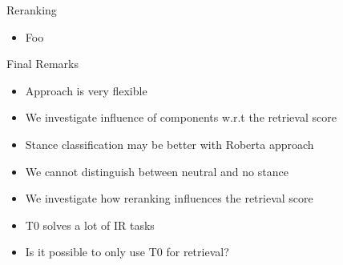 \documentclass[english]{mlutalk}
\begin{document}
\begin{frame}{Reranking}
    \begin{itemize}
        \item Foo
    \end{itemize}
\end{frame}

\begin{frame}{Final Remarks}
    \begin{itemize}
        \item Approach is very flexible 
        \item We investigate influence of components w.r.t the retrieval score
        \item Stance classification may be better with Roberta approach
        \item We cannot distinguish between neutral and no stance
        \item We investigate how reranking influences the retrieval score
        \item T0 solves a lot of IR tasks
        \item Is it possible to only use T0 for retrieval?
    \end{itemize}
    \thankyou
\end{frame}

\appendix
\section{\appendixname}

\bibliographyframe
\end{document}
